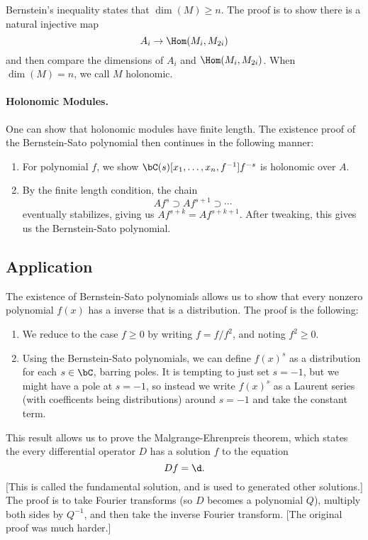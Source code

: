Bernstein's inequality states that $\dim(M) \ge n$. The proof is to show there is a natural injective map
\[
    A_i \to \Hom(M_i, M_{2i})
\]
and then compare the dimensions of $A_i$ and $\Hom(M_i, M_{2i})$. When $\dim(M) = n$, we call $M$ holonomic.

\paragraph{Holonomic Modules.} One can show that holonomic modules have finite length. The existence proof of the Bernstein-Sato polynomial then continues in the following manner:
\begin{enumerate}
    \item For polynomial $f$, we show $\bC(s)[x_1, \dots, x_n, f^{-1}]f^{-s}$ is holonomic over $A$.
    \item By the finite length condition, the chain
    \[
        Af^s \supset Af^{s+1} \supset \cdots
    \]
    eventually stabilizes, giving us $Af^{s+k} = Af^{s+k+1}$. After tweaking, this gives us the Bernstein-Sato polynomial.
\end{enumerate}

\subsection{Application}
The existence of Bernstein-Sato polynomials allows us to show that every nonzero polynomial $f(x)$ has a inverse that is a distribution. The proof is the following: 
\begin{enumerate}
    \item We reduce to the case $f \geq 0$ by writing $f = f/f^2$, and noting $f^2 \geq 0$.
    \item Using the Bernstein-Sato polynomials, we can define $f(x)^s$ as a distribution for each $s \in \bC$, barring poles. It is tempting to just set $s = -1$, but we might have a pole at $s = -1$, so instead we write $f(x)^s$ as a Laurent series (with coefficents being distributions) around $s = -1$ and take the constant term.
\end{enumerate}
This result allows us to prove the Malgrange-Ehrenpreis theorem, which states the every differential operator $D$ has a solution $f$ to the equation
\[
    Df = \d.
\]
[This is called the fundamental solution, and is used to generated other solutions.] The proof is to take Fourier transforms (so $D$ becomes a polynomial $Q$), multiply both sides by $Q^{-1}$, and then take the inverse Fourier transform. [The original proof was much harder.]

